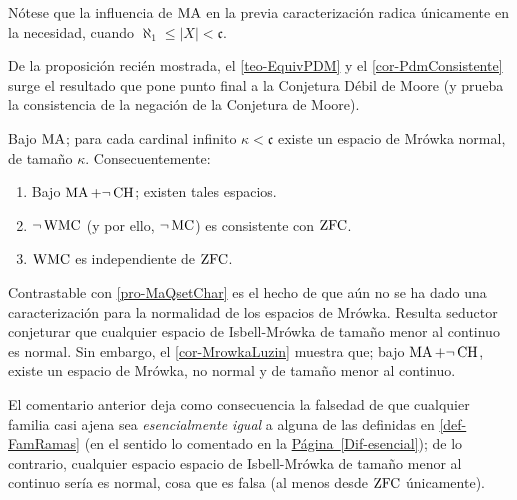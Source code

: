 Nótese que la influencia de $\operatorname{MA}$ en la previa caracterización radica únicamente en la necesidad, cuando $\aleph_1 \leq |X| < \mathfrak{c}$.

De la proposición recién mostrada, el \autoref{teo-EquivPDM} y el \autoref{cor-PdmConsistente} surge el resultado que pone punto final a la Conjetura Débil de Moore (y prueba la consistencia de la negación de la Conjetura de Moore).

\begin{corolario}\label{cor-PdmIndependiente}
	Bajo $\operatorname{MA}$; para cada cardinal infinito $\kappa<\mathfrak{c}$ existe un espacio de Mrówka normal, de tamaño $\kappa$. Consecuentemente:
	\begin{enumerate}
		\item Bajo $\operatorname{MA}+\lnot \operatorname{CH}$; existen tales espacios.
		\item $\lnot\operatorname{WMC}$ (y por ello, $\lnot\operatorname{MC}$) es consistente con $\operatorname{ZFC}$.
		\item $\operatorname{WMC}$ es independiente de $\operatorname{ZFC}$.
	\end{enumerate}
\end{corolario}

Contrastable con \ref{pro-MaQsetChar} es el hecho de que aún no se ha dado una caracterización para la normalidad de los espacios de Mrówka. Resulta seductor conjeturar que cualquier espacio de Isbell-Mrówka de tamaño menor al continuo es normal. Sin embargo, el \autoref{cor-MrowkaLuzin} muestra que; bajo $\operatorname{MA}+\lnot \operatorname{CH}$, existe un espacio de Mrówka, no normal y de tamaño menor al continuo.

El comentario anterior deja como consecuencia la falsedad de que cualquier familia casi ajena sea \textit{esencialmente igual} a alguna de las definidas en \ref{def-FamRamas} (en el sentido lo comentado en la \hyperref[Dif-esencial]{Página~\ref{Dif-esencial}}); de lo contrario, cualquier espacio espacio de Isbell-Mrówka de tamaño menor al continuo sería es normal, cosa que es falsa (al menos desde $\operatorname{ZFC}$ únicamente).

